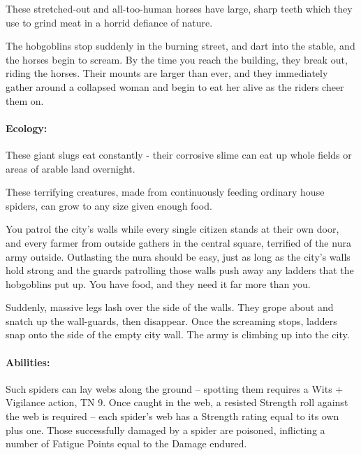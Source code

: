 \begin{multicols}{2}
\label{nura_horse}
\nurahorse

These stretched-out and all-too-human horses have large, sharp teeth which they use to grind meat in a horrid defiance of nature.

\begin{boxtext}

	The hobgoblins stop suddenly in the burning street, and dart into the stable, and the horses begin to scream.
	By the time you reach the building, they break out, riding the horses.
	Their mounts are larger than ever, and they immediately gather around a collapsed woman and begin to eat her alive as the riders cheer them on.

\end{boxtext}

\label{nura_slug}

\paragraph{Ecology:} These giant slugs eat constantly - their corrosive slime can eat up whole fields or areas of arable land overnight.


\label{nura_spider}

These terrifying creatures, made from continuously feeding ordinary house spiders, can grow to any size given enough food.

\begin{boxtext}

	You patrol the city's walls while every single citizen stands at their own door, and every farmer from outside gathers in the central square, terrified of the nura army outside.
	Outlasting the nura should be easy, just as long as the city's walls hold strong and the guards patrolling those walls push away any ladders that the hobgoblins put up.
	You have food, and they need it far more than you.

	Suddenly, massive legs lash over the side of the walls.
	They grope about and snatch up the wall-guards, then disappear.
	Once the screaming stops, ladders snap onto the side of the empty city wall.
	The army is climbing up into the city.

\end{boxtext}

\nuraspider

\paragraph{Abilities:} Such spiders can lay webs along the ground -- spotting them requires a Wits + Vigilance action, TN 9.
Once caught in the web, a resisted Strength roll against the web is required -- each spider's web has a Strength rating equal to its own plus one.
Those successfully damaged by a spider are poisoned, inflicting a number of Fatigue Points equal to the Damage endured.


\end{multicols}
